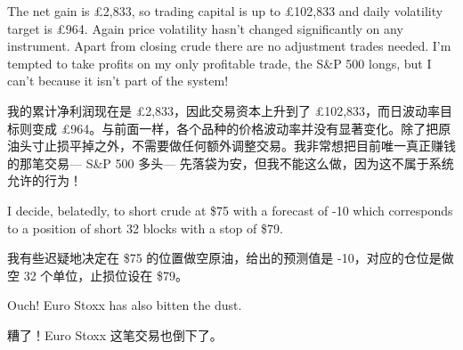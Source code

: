 \begin{englishblock} The net gain is £2,833, so trading capital is up to £102,833 and daily volatility target is £964. Again price volatility hasn't changed significantly on any instrument. Apart from closing crude there are no adjustment trades needed. I'm tempted to take profits on my only profitable trade, the S\&P 500 longs, but I can't because it isn't part of the system! \end{englishblock}

\begin{chineseblock}我的累计净利润现在是 £2,833，因此交易资本上升到了 £102,833，而日波动率目标则变成 £964。与前面一样，各个品种的价格波动率并没有显著变化。除了把原油头寸止损平掉之外，不需要做任何额外调整交易。我非常想把目前唯一真正赚钱的那笔交易--- S\&P 500 多头--- 先落袋为安，但我不能这么做，因为这不属于系统允许的行为！\end{chineseblock}


\begin{englishblock} I decide, belatedly, to short crude at \$75 with a forecast of -10 which corresponds to a position of short 32 blocks with a stop of \$79. \end{englishblock}

\begin{chineseblock}我有些迟疑地决定在 \$75 的位置做空原油，给出的预测值是 -10，对应的仓位是做空 32 个单位，止损位设在 \$79。 \end{chineseblock}


\begin{englishblock} Ouch! Euro Stoxx has also bitten the dust. \end{englishblock}

\begin{chineseblock}糟了！Euro Stoxx 这笔交易也倒下了。\end{chineseblock}

